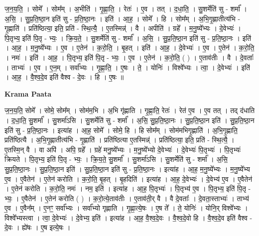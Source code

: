 \documentclass[17pt]{extarticle}
\begin{document}
ज॒न॒य॒ति॒ । सोमे᳚ । सोम᳚म् । अ॒भीति॑ । गृ॒ह्णा॒ति॒ । रेतः॑ । ए॒व । तत् । द॒धा॒ति॒ । सु॒शर्मेति॑ सु - शर्मा᳚ । अ॒सि॒ । सु॒प्र॒ति॒ष्ठा॒न इति॑ सु - प्र॒ति॒ष्ठा॒नः । इति॑ । आ॒ह॒ । सोमे᳚ । हि । सोम᳚म् । अ॒भि॒गृ॒ह्णातीत्य॑भि - गृ॒ह्णाति॑ । प्रति॑ष्ठित्या॒ इति॒ प्रति॑ - स्थि॒त्यै॒ । ए॒तस्मिन्न्॑ । वै । अपीति॑ । ग्रहे᳚ । म॒नु॒ष्ये᳚भ्यः । दे॒वेभ्यः॑ । पि॒तृभ्य॒ इति॑ पि॒तृ - भ्यः॒ । क्रि॒य॒ते॒ । सु॒शर्मेति॑ सु - शर्मा᳚ । अ॒सि॒ । सु॒प्र॒ति॒ष्ठा॒न इति॑ सु - प्र॒ति॒ष्ठा॒नः । इति॑ । आ॒ह॒ । म॒नु॒ष्ये᳚भ्यः । ए॒व । ए॒तेन॑ । क॒रो॒ति॒ । बृ॒हत् । इति॑ । आ॒ह॒ । दे॒वेभ्यः॑ । ए॒व । ए॒तेन॑ । क॒रो॒ति॒ । नमः॑ । इति॑ । आ॒ह॒ । पि॒तृभ्य॒ इति॑ पि॒तृ - भ्यः॒ । ए॒व । ए॒तेन॑ । क॒रो॒ति॒ ( ) । ए॒ताव॑तीः । वै । दे॒वताः᳚ । ताभ्यः॑ । ए॒व । ए॒न॒म् । सर्वा᳚भ्यः । गृ॒ह्णा॒ति॒ । ए॒षः । ते॒ । योनिः॑ । विश्वे᳚भ्यः । त्वा॒ । दे॒वेभ्यः॑ । इति॑ । आ॒ह॒ । वै॒श्व॒दे॒व इति॑ वैश्व - दे॒वः । हि । ए॒षः ॥  \newline


\textbf{Krama Paata} \newline

ज॒न॒य॒ति॒ सोमे᳚ । सोमे॒ सोम᳚म् । सोम॑म॒भि । अ॒भि गृ॑ह्णाति । गृ॒ह्णा॒ति॒ रेतः॑ । रेत॑ ए॒व । ए॒व तत् । तद् द॑धाति । द॒धा॒ति॒ सु॒शर्मा᳚ । सु॒शर्मा॑ऽसि । सु॒शर्मेति॑ सु - शर्मा᳚ । अ॒सि॒ सु॒प्र॒ति॒ष्ठा॒नः । सु॒प्र॒ति॒ष्ठा॒न इति॑ । सु॒प्र॒ति॒ष्ठा॒न इति॑ सु - प्र॒ति॒ष्ठा॒नः । इत्या॑ह । आ॒ह॒ सोमे᳚ । सोमे॒ हि । हि सोम᳚म् । सोम॑मभिगृ॒ह्णाति॑ । अ॒भि॒गृ॒ह्णाति॒ प्रति॑ष्ठित्यै । अ॒भि॒गृ॒ह्णातीत्य॑भि - गृ॒ह्णाति॑ । प्रति॑ष्ठित्या ए॒तस्मिन्न्॑ । प्रति॑ष्ठित्या॒ इति॒ प्रति॑ - स्थि॒त्यै॒ । ए॒तस्मि॒न् वै । वा अपि॑ । अपि॒ ग्रहे᳚ । ग्रहे॑ मनु॒ष्ये᳚भ्यः । म॒नु॒ष्ये᳚भ्यो दे॒वेभ्यः॑ । दे॒वेभ्यः॑ पि॒तृभ्यः॑ । पि॒तृभ्यः॑ क्रियते । पि॒तृभ्य॒ इति॑ पि॒तृ - भ्यः॒ । क्रि॒य॒ते॒ सु॒शर्मा᳚ । सु॒शर्मा॑ऽसि । सु॒शर्मेति॑ सु - शर्मा᳚ । अ॒सि॒ सु॒प्र॒ति॒ष्ठा॒नः । सु॒प्र॒ति॒ष्ठा॒न इति॑ । सु॒प्र॒ति॒ष्ठा॒न इति॑ सु - प्र॒ति॒ष्ठा॒नः । इत्या॑ह । आ॒ह॒ म॒नु॒ष्ये᳚भ्यः । म॒नु॒ष्ये᳚भ्य ए॒व । ए॒वैतेन॑ । ए॒तेन॑ करोति । क॒रो॒ति॒ बृ॒हत् । बृ॒हदिति॑ । इत्या॑ह । आ॒ह॒ दे॒वेभ्यः॑ । दे॒वेभ्य॑ ए॒व । ए॒वैतेन॑ । ए॒तेन॑ करोति । क॒रो॒ति॒ नमः॑ । नम॒ इति॑ । इत्या॑ह । आ॒ह॒ पि॒तृभ्यः॑ । पि॒तृभ्य॑ ए॒व । पि॒तृभ्य॒ इति॑ पि॒तृ - भ्यः॒ । ए॒वैतेन॑ । ए॒तेन॑ करोति ( ) । क॒रो॒त्ये॒ताव॑तीः । ए॒ताव॑ती॒र् वै । वै दे॒वताः᳚ । दे॒वता॒स्ताभ्यः॑ । ताभ्य॑ ए॒व । ए॒वैन᳚म् । ए॒नꣳ॒॒ सर्वा᳚भ्यः । सर्वा᳚भ्यो गृह्णाति । गृ॒ह्णा॒त्ये॒षः । ए॒ष ते᳚ । ते॒ योनिः॑ । योनि॒र् विश्वे᳚भ्यः । विश्वे᳚भ्यस्त्वा । त्वा॒ दे॒वेभ्यः॑ । दे॒वेभ्य॒ इति॑ । इत्या॑ह । आ॒ह॒ वै॒श्व॒दे॒वः । वै॒श्व॒दे॒वो हि । वै॒श्व॒दे॒व इति॑ वैश्व - दे॒वः । ह्ये॑षः । ए॒ष इत्ये॒षः । \newline
\end{document}
